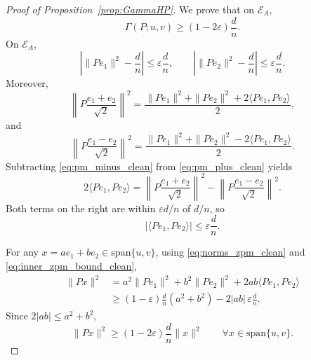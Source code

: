 \documentclass{article}
\begin{document}
\begin{proof}[Proof of Proposition~\ref{prop:GammaHP}]
We prove that on \(\mathcal E_A\),
\begin{equation}
\Gamma(P;u,v)\ge (1-2\varepsilon)\frac dn.
\label{eq:GammaA_clean}
\end{equation}
On \(\mathcal E_A\),
\begin{equation}
\left|\|Pe_1\|^2-\frac dn\right|\le \varepsilon\frac dn,
\qquad
\left|\|Pe_2\|^2-\frac dn\right|\le \varepsilon\frac dn.
\label{eq:norms_zpm_clean}
\end{equation}
Moreover,
\begin{equation}
\left\|P\frac{e_1+e_2}{\sqrt2}\right\|^2
=
\frac{\|Pe_1\|^2+\|Pe_2\|^2+2\langle Pe_1,Pe_2\rangle}{2},
\label{eq:pm_plus_clean}
\end{equation}
and
\begin{equation}
\left\|P\frac{e_1-e_2}{\sqrt2}\right\|^2
=
\frac{\|Pe_1\|^2+\|Pe_2\|^2-2\langle Pe_1,Pe_2\rangle}{2}.
\label{eq:pm_minus_clean}
\end{equation}
Subtracting \eqref{eq:pm_minus_clean} from \eqref{eq:pm_plus_clean} yields
\[
2\langle Pe_1,Pe_2\rangle
=
\left\|P\frac{e_1+e_2}{\sqrt2}\right\|^2
-
\left\|P\frac{e_1-e_2}{\sqrt2}\right\|^2.
\]
Both terms on the right are within \(\varepsilon d/n\) of \(d/n\), so
\begin{equation}
|\langle Pe_1,Pe_2\rangle|
\le
\varepsilon\frac dn.
\label{eq:inner_zpm_bound_clean}
\end{equation}

For any \(x=ae_1+be_2\in\mathrm{span}\{u,v\}\), using
\eqref{eq:norms_zpm_clean} and \eqref{eq:inner_zpm_bound_clean},
\begin{align}
\|Px\|^2
&=
a^2\|Pe_1\|^2+b^2\|Pe_2\|^2
+2ab\langle Pe_1,Pe_2\rangle \nonumber\\
&\ge
(1-\varepsilon)\frac dn(a^2+b^2)
-
2|ab|\,\varepsilon\frac dn.
\label{eq:plane_pre_clean}
\end{align}
Since \(2|ab|\le a^2+b^2\),
\begin{equation}
\|Px\|^2
\ge
(1-2\varepsilon)\frac dn\|x\|^2
\qquad
\forall x\in\mathrm{span}\{u,v\}.
\label{eq:planeLower_clean}
\end{equation}


\end{proof}
\end{document}
